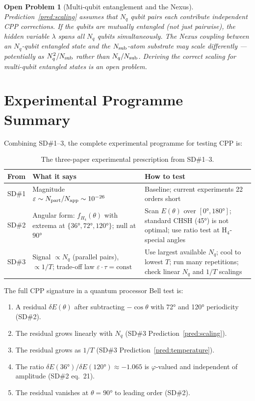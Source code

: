 \documentclass[11pt,a4paper]{article}
\newtheorem{openprob}[theorem]{Open Problem}
\newcommand{\phig}{\varphi}
\newcommand{\eps}{\varepsilon}
\begin{document}
\begin{openprob}[Multi-qubit entanglement and the Nexus]
\label{op:multiqubit}
Prediction~\ref{pred:scaling} assumes that $N_q$ qubit pairs each
contribute independent CPP corrections.  If the qubits are
\emph{mutually entangled} (not just pairwise), the hidden variable
$\lambda$ spans all $N_q$ qubits simultaneously.  The Nexus
coupling between an $N_q$-qubit entangled state and the $N_{\rm
sub}$-atom substrate may scale differently --- potentially as
$N_q^2/N_{\rm sub}$ rather than $N_q/N_{\rm sub}$.  Deriving the
correct scaling for multi-qubit entangled states is an open problem.
\end{openprob}

\section{Experimental Programme Summary}

Combining SD\#1--3, the complete experimental programme for testing
CPP is:

\begin{table}[H]
\centering
\caption{The three-paper experimental prescription from SD\#1--3.}
\label{tab:programme}
\begin{tabular}{@{}p{2cm}p{5cm}p{5.5cm}@{}}
\toprule
From & What it says & How to test \\
\midrule
SD\#1 & Magnitude $\eps \sim N_{\rm part}/N_{\rm app} \sim 10^{-26}$ &
  Baseline; current experiments 22 orders short \\[4pt]
SD\#2 & Angular form: $f_{H_4}(\theta)$ with extrema at $\{36°, 72°, 120°\}$;
  null at $90°$ &
  Scan $E(\theta)$ over $[0°, 180°]$; standard CHSH (45°) is not optimal;
  use ratio test at H$_4$-special angles \\[4pt]
SD\#3 & Signal $\propto N_q$ (parallel pairs), $\propto 1/T$;
  trade-off law $\eps \cdot \tau = \text{const}$ &
  Use largest available $N_q$; cool to lowest $T$;
  run many repetitions; check linear $N_q$ and $1/T$ scalings \\
\bottomrule
\end{tabular}
\end{table}

The full CPP signature in a quantum processor Bell test is:
\begin{enumerate}
\item A residual $\delta E(\theta)$ after subtracting $-\cos\theta$
  with 72° and 120° periodicity (SD\#2).
\item The residual grows linearly with $N_q$ (SD\#3
  Prediction~\ref{pred:scaling}).
\item The residual grows as $1/T$ (SD\#3 Prediction~\ref{pred:temperature}).
\item The ratio $\delta E(36°)/\delta E(120°) \approx -1.065$ is
  $\phig$-valued and independent of amplitude (SD\#2 eq.~21).
\item The residual vanishes at $\theta = 90°$ to leading order (SD\#2).
\end{enumerate}
\end{document}
